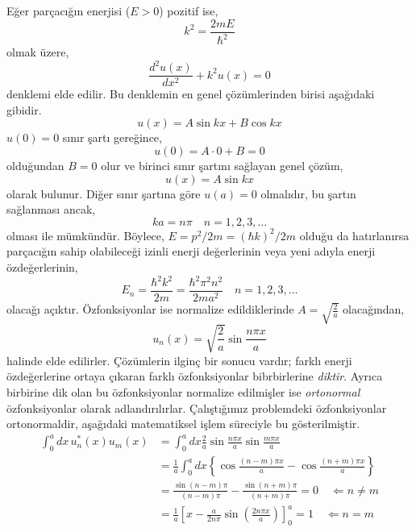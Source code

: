\documentclass[a4paper,12pt, twoside]{article}
\begin{document}
Eğer parçacığın enerjisi ($E>0$) pozitif ise,
\begin{equation}
k ^ { 2 } = \frac { 2 m E } { \hbar ^ { 2 } }
\end{equation}
olmak üzere,
\begin{equation}
\frac { d ^ { 2 } u ( x ) } { d x ^ { 2 } } + k ^ { 2 } u ( x ) = 0
\end{equation}
denklemi elde edilir. Bu denklemin en genel çözümlerinden birisi aşağıdaki gibidir.
\begin{equation}
u(x) = A \sin k x + B \cos k x
\end{equation}
$u(0)=0$ sınır şartı gereğince,
\begin{equation*}
u(0) = A\cdot 0 + B = 0
\end{equation*}
olduğundan $B=0$ olur ve birinci sınır şartını sağlayan genel çözüm,
\begin{equation}
u(x) = A \sin k x
\end{equation}
olarak bulunur. Diğer sınır şartına göre $u(a)=0$ olmalıdır, bu şartın sağlanması ancak,
\begin{equation}
k a = n \pi \quad n = 1,2,3 , \ldots
\end{equation}
olması ile mümkündür. Böylece, $E = p^2/2m = (\hbar k)^2/2m$ olduğu da hatırlanırsa parçacığın sahip olabileceği izinli enerji değerlerinin veya yeni adıyla enerji özdeğerlerinin,
\begin{equation}
E _ { n } = \frac { \hbar ^ { 2 } k ^ { 2 } } { 2 m } = \frac { \hbar ^ { 2 } \pi ^ { 2 } n ^ { 2 } } { 2 m a ^ { 2 } } \quad n = 1,2,3 , \ldots
\end{equation}
olacağı açıktır. Özfonksiyonlar ise normalize edildiklerinde $A=\sqrt { \frac { 2 } { a } }$ olacağından,
\begin{equation}
u _ { n } ( x ) = \sqrt { \frac { 2 } { a } } \sin \frac { n \pi x } { a }
\end{equation}
halinde elde edilirler. Çözümlerin ilginç bir sonucu vardır; farklı enerji özdeğerlerine ortaya çıkaran farklı özfonksiyonlar bibrbirlerine \emph{diktir}. Ayrıca birbirine dik olan bu özfonksiyonlar normalize edilmişler ise \emph{ortonormal} özfonksiyonlar olarak adlandırılırlar. Çalıştığımız problemdeki özfonksiyonlar ortonormaldir, aşağıdaki matematiksel işlem süreciyle bu gösterilmiştir.
\begin{align} 
	\int _ { 0 } ^ { a } d x \, u _ { n } ^ { * } ( x ) u _ { m } ( x ) 
	& = \int _ { 0 } ^ { a } d x \frac { 2 } { a } \sin \frac { n \pi x } { a } \sin \frac { m \pi x } { a } \nonumber\\ 
	& = \frac { 1 } { a } \int _ { 0 } ^ { a } d x \left\{ \cos \frac { ( n - m ) \pi x } { a } - \cos \frac { ( n + m ) \pi x } { a } \right\} \nonumber\\ 
	& = \frac { \sin ( n - m ) \pi } { ( n - m ) \pi } - \frac { \sin ( n + m ) \pi } { ( n + m ) \pi } = 0 \quad \Leftarrow n \neq m \nonumber\\
	& = \frac{1}{a}\left[x-\frac{a}{2 n \pi}\sin(\frac{2n\pi x}{a})\right]_0^a = 1 \quad \Leftarrow n = m
\end{align}
\end{document}
